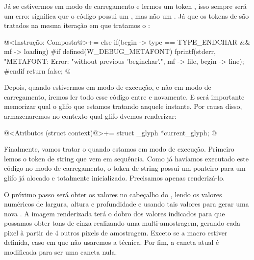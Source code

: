 {{{{{{Já se estivermos em modo de carregamento e lermos um
token , isso sempre será um erro: significa que o
código possui um , mas não
um . Já que os tokens de 
são tratados na mesma iteração em que tratamos
o :

\iniciocodigo
@<Instrução: Composta@>+=
else if(begin -> type == TYPE_ENDCHAR && mf -> loading){
#if defined(W_DEBUG_METAFONT)
  fprintf(stderr, "METAFONT: Error: %
                  "without previous 'beginchar'.\n", mf -> file,
                  begin -> line);
#endif
  return false;
}
@
\fimcodigo

Depois, quando estivermos em modo de execução, e não em modo de
carregamento, iremos ler todo esse código entre 
e  novamente. E será importante memorizar qual o
glifo que estamos tratando anquele instante. Por causa disso,
armazenaremos no contexto qual glifo dvemos renderizar:

\iniciocodigo
@<Atributos (struct context)@>+=
struct _glyph *current_glyph;
@
\fimcodigo

Finalmente, vamos tratar o  quando estamos em
modo de execução. Primeiro lemos o token de string que vem em
sequência. Como já havíamos executado este código no modo de
carregamento, o token de string possui um ponteiro para um glifo já
alocado e totalmente inicializado. Precisamos apenas renderizá-lo.

O próximo passo será obter os valores no cabeçalho
do , lendo os valores numéricos de largura,
altura e profundidade e usando tais valores para gerar uma
nova . A imagem renderizada terá o dobro
dos valores indicados para que possamos obter tons de cinza realizando
uma multi-amostragem, gerando cada pixel à partir de 4 outros pixels
de amostragem. Exceto se a
macro  estiver
definida, caso em que não usaremos a técnica.  Por fim, a caneta atual
é modificada para ser uma caneta nula.


}}}}}}

